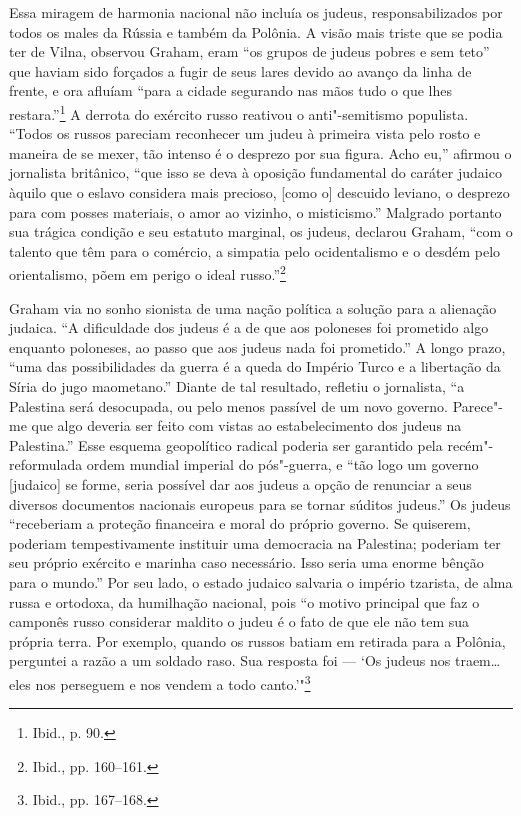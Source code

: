 %

Essa miragem de harmonia nacional não incluía os judeus,
responsabilizados por todos os males da Rússia e também da Polônia. A
visão mais triste que se podia ter de Vilna, observou Graham, eram ``os
grupos de judeus pobres e sem teto'' que haviam sido forçados a fugir de
seus lares devido ao avanço da linha de frente, e ora afluíam ``para a
cidade segurando nas mãos tudo o que lhes restara.''\footnote{Ibid., p.
  90.} A derrota do exército russo reativou o anti"-semitismo populista.
``Todos os russos pareciam reconhecer um judeu à primeira vista pelo
rosto e maneira de se mexer, tão intenso é o desprezo por sua figura.
Acho eu,'' afirmou o jornalista britânico, ``que isso se deva à oposição
fundamental do caráter judaico àquilo que o eslavo considera mais
precioso, {[}como o{]} descuido leviano, o desprezo para com posses
materiais, o amor ao vizinho, o misticismo.'' Malgrado portanto sua
trágica condição e seu estatuto marginal, os judeus, declarou Graham,
``com o talento que têm para o comércio, a simpatia pelo ocidentalismo e
o desdém pelo orientalismo, põem em perigo o ideal russo.''\footnote{Ibid.,
  pp. 160--161.}

Graham via no sonho sionista de uma nação política a solução para a
alienação judaica. ``A dificuldade dos judeus é a de que aos poloneses
foi prometido algo enquanto poloneses, ao passo que aos judeus nada foi
prometido.'' A longo prazo, ``uma das possibilidades da guerra é a queda
do Império Turco e a libertação da Síria do jugo maometano.'' Diante de
tal resultado, refletiu o jornalista, ``a Palestina será desocupada, ou
pelo menos passível de um novo governo. Parece"-me que algo deveria ser
feito com vistas ao estabelecimento dos judeus na Palestina.'' Esse
esquema geopolítico radical poderia ser garantido pela recém"-reformulada
ordem mundial imperial do pós"-guerra, e ``tão logo um governo
{[}judaico{]} se forme, seria possível dar aos judeus a opção de
renunciar a seus diversos documentos nacionais europeus para se tornar
súditos judeus.'' Os judeus ``receberiam a proteção financeira e moral
do próprio governo. Se quiserem, poderiam tempestivamente instituir uma
democracia na Palestina; poderiam ter seu próprio exército e marinha
caso necessário. Isso seria uma enorme bênção para o mundo.'' Por seu
lado, o estado judaico salvaria o império tzarista, de alma russa e
ortodoxa, da humilhação nacional, pois ``o motivo principal que faz o
camponês russo considerar maldito o judeu é o fato de que ele não tem
sua própria terra. Por exemplo, quando os russos batiam em retirada para
a Polônia, perguntei a razão a um soldado raso. Sua resposta foi --- `Os
judeus nos traem\ldots{} eles nos perseguem e nos vendem a todo
canto.'"\footnote{Ibid., pp. 167--168.}

